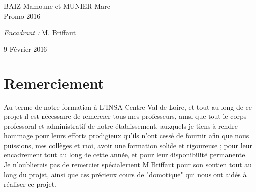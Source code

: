 {\begin{titlepage}
\begin{sffamily}
\begin{center}
    \begin{minipage}{0.4\textwidth}
      \begin{flushleft} \large
        BAIZ Mamoune et MUNIER Marc \\
        Promo 2016\\
      \end{flushleft}
    \end{minipage}
    \begin{minipage}{0.4\textwidth}
      \begin{flushright} \large
        \emph{Encadrant :} M. Briffaut\\
      \end{flushright}
    \end{minipage}

    \vfill

    {\large 9 Février 2016}

  \end{center}
  \end{sffamily}
\end{titlepage}
}
\newpage
\newpage



\newpage
\section*{Remerciement}
Au terme de notre formation à L’INSA Centre Val de Loire, et tout au long de ce projet il est nécessaire de remercier tous mes professeurs, ainsi que tout le corps professoral et administratif de notre établissement, auxquels je tiens à rendre hommage pour leurs efforts prodigieux qu’ils n’ont cessé de fournir afin que nous puissions, mes collèges et moi, avoir une formation solide et rigoureuse ; pour leur encadrement tout au long de cette année, et pour leur disponibilité permanente. Je n’oublierais pas de remercier spécialement M.Briffaut pour son soutien tout au long du projet, ainsi que ces précieux cours de "domotique" qui nous ont aidés à réaliser ce projet.\newline

\clearpage
\newpage

